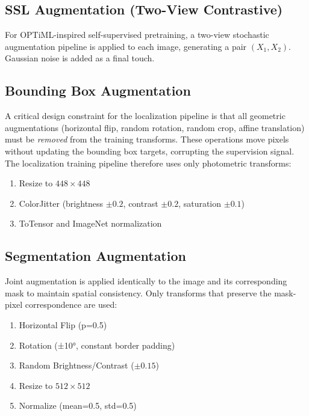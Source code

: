 \subsection{SSL Augmentation (Two-View Contrastive)}

For OPTiML-inspired self-supervised pretraining, a two-view stochastic augmentation pipeline is applied to each image, generating a pair $(X_1, X_2)$. Gaussian noise is added as a final touch.

\subsection{Bounding Box Augmentation}

A critical design constraint for the localization pipeline is that all geometric augmentations (horizontal flip, random rotation, random crop, affine translation) must be \emph{removed} from the training transforms. These operations move pixels without updating the bounding box targets, corrupting the supervision signal. The localization training pipeline therefore uses only photometric transforms:

\begin{enumerate}
    \item Resize to $448 \times 448$
    \item ColorJitter (brightness $\pm 0.2$, contrast $\pm 0.2$, saturation $\pm 0.1$)
    \item ToTensor and ImageNet normalization
\end{enumerate}

\subsection{Segmentation Augmentation}

Joint augmentation is applied identically to the image and its corresponding mask to maintain spatial consistency. Only transforms that preserve the mask-pixel correspondence are used:

\begin{enumerate}
    \item Horizontal Flip (p=0.5)
    \item Rotation (±10°, constant border padding)
    \item Random Brightness/Contrast ($\pm 0.15$)
    \item Resize to $512 \times 512$
    \item Normalize (mean=0.5, std=0.5)
\end{enumerate}

